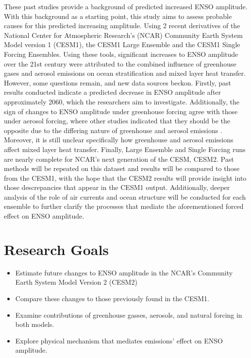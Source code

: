 \documentclass[11pt]{article}
\begin{document}
These past studies provide a background of predicted increased ENSO amplitude. With this background as a starting point, this study aims to assess probable causes for this predicted increasing amplitude. Using 2 recent derivatives of the National Center for Atmospheric Research's (NCAR) Community Earth System Model version 1 (CESM1), the CESM1 Large Ensemble and the CESM1 Single Forcing Ensembles. Using these tools, significant increases to ENSO amplitude over the 21st century were attributed to the combined influence of greenhouse gases and aerosol emissions on ocean stratification and mixed layer heat transfer. However, some questions remain, and new data sources beckon. Firstly, past results conducted indicate a predicted decrease in ENSO amplitude after approximately 2060, which the researchers aim to investigate. Additionally, the sign of changes to ENSO amplitude under greenhouse forcing agree with those under aerosol forcing, where other studies indicated that they should be the opposite due to the differing nature of greenhouse and aerosol emissions \citep{deser2020isolating}. Moreover, it is still unclear specifically how greenhouse and aerosol emissions affect mixed layer heat transfer. Finally, Large Ensemble and Single Forcing runs are nearly complete for NCAR's next generation of the CESM, CESM2. Past methods will be repeated on this dataset and results will be compared to those from the CESM1, with the hope that the CESM2 results will provide insight into those descrepancies that appear in the CESM1 output. Additionally, deeper analysis of the role of air currents and ocean structure will be conducted for each ensemble to further clarify the processes that mediate the aforementioned forced effect on ENSO amplitude.

\section{Research Goals}
\label{sec:org3779bf2}
\begin{itemize}
\item Estimate future changes to ENSO amplitude in the NCAR's Community Earth System Model Version 2 (CESM2)
\item Compare these changes to those previously found in the CESM1.
\item Examine contributions of greenhouse gasses, aerosols, and natural forcing in both models.
\item Explore physical mechanism that mediates emissions' effect on ENSO amplitude.
\end{itemize}
\end{document}
